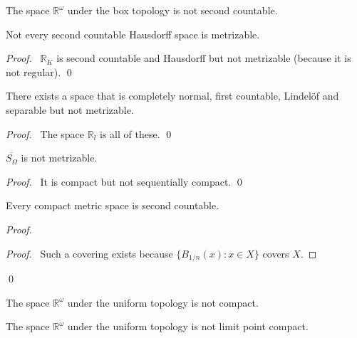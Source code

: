 \begin{cor}
 The space $\mathbb{R}^\omega$ under the box topology is not second countable.
\end{cor}

\begin{prop}
Not every second countable Hausdorff space is metrizable.
\end{prop}

\begin{proof}
\pf\ $\mathbb{R}_K$ is second countable and Hausdorff but not metrizable
(because it is not regular). \qed
\end{proof}

\begin{prop}
 There exists a space that is completely normal, first countable,
Lindel\"{o}f and separable but not metrizable.
\end{prop}

\begin{proof}
 \pf\ The space $\mathbb{R}_l$ is all of these. \qed
\end{proof}

\begin{prop}
 $\overline{S_\Omega}$ is not metrizable.
\end{prop}

\begin{proof}
\pf\ It is compact but not sequentially compact. \qed
\end{proof}

\begin{prop}
Every compact metric space is second countable.
\end{prop}

\begin{proof}
\pf
{}
\begin{proof}
\pf\ Such a covering exists because $\{ B_{1/n}(x) : x \in X\}$ covers $X$.
\end{proof}
\qed
\end{proof}

\begin{cor}
 The space $\mathbb{R}^\omega$ under the uniform topology is not compact.
\end{cor}

\begin{cor}
 The space $\mathbb{R}^\omega$ under the uniform topology is not limit
point compact.
\end{cor}

